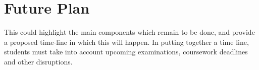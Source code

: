 \chapter{Future Plan}\label{C:fut} 

This could highlight the main components which remain to be done, and provide a proposed time-line in which this will happen. In putting together a time line, students must take into account upcoming examinations, coursework deadlines and other disruptions. 